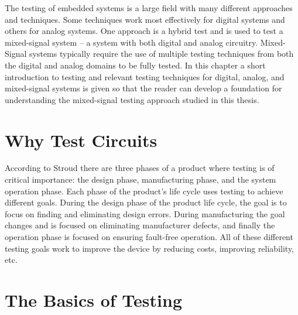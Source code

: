 \documentclass[12pt]{report}
\begin{document}
The testing of embedded systems is a large field with many different approaches and techniques.  Some techniques work most effectively for digital systems and others for analog systems.  One approach is a hybrid test and is used to test a mixed-signal system -- a system with both digital and analog circuitry.  Mixed-Signal systems typically require the use of multiple testing techniques from both the digital and analog domains to be fully tested.  In this chapter a short introduction to testing and relevant testing techniques for digital, analog, and mixed-signal systems is given so that the reader can develop a foundation for understanding the mixed-signal testing approach studied in this thesis. 

\section{Why Test Circuits}
\label{sct:whytest}
According to Stroud\cite{stroud} there are three phases of a product where testing is of critical importance: the design phase, manufacturing phase, and the system operation phase.  Each phase of the product's life cycle uses testing to achieve different goals.  During the design phase of the product life cycle, the goal is to focus on finding and eliminating design errors.  During manufacturing the goal changes and is focused on eliminating manufacturer defects, and finally the operation phase is focused on ensuring fault-free operation.  All of these different testing goals work to improve the device by reducing costs, improving reliability, etc.  

\section{The Basics of Testing}
\label{sct:basictesting}
\end{document}

